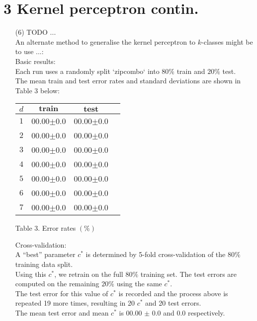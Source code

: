 \documentclass[a4paper,12pt]{article}
\begin{document}
\section*{3 Kernel perceptron contin.}
\begin{enumerate}
\item[(6)] TODO ...\\

An alternate method to generalise the kernel perceptron to $k$-classes might be to use ...: \\

Basic results: \\
Each run uses a randomly split `zipcombo` into $80\%$ train and $20\%$ test. \\
The mean train and test error rates and standard deviations are shown in Table 3 below:

\begin{tabular}{|c|c|c|c|}
\hline
$d$&$\textbf{train}$&$\textbf{test}$\\
\hline
$1$&00.00$\pm$0.0&00.00$\pm$0.0\\
\hline
$2$&00.00$\pm$0.0&00.00$\pm$0.0\\
\hline
$3$&00.00$\pm$0.0&00.00$\pm$0.0\\
\hline
$4$&00.00$\pm$0.0&00.00$\pm$0.0\\
\hline
$5$&00.00$\pm$0.0&00.00$\pm$0.0\\
\hline
$6$&00.00$\pm$0.0&00.00$\pm$0.0\\
\hline
$7$&00.00$\pm$0.0&00.00$\pm$0.0\\
\hline
\end{tabular}\par 
Table 3. Error rates $(\%)$

Cross-validation: \\
A “best” parameter $c^*$ is determined by 5-fold cross-validation of the $80\%$ training data split. \\
Using this $c^*$, we retrain on the full $80\%$ training set. The test errors are computed on the remaining $20\%$ using the same $c^*$. \\
The test error for this value of $c^*$ is recorded and the process above is repeated 19 more times, resulting in 20 $c^*$ and 20 test errors.\\
The mean test error and mean $c^*$ is 00.00 $\pm$ 0.0 and 0.0 respectively.


\end{enumerate}
\clearpage
\end{document}
